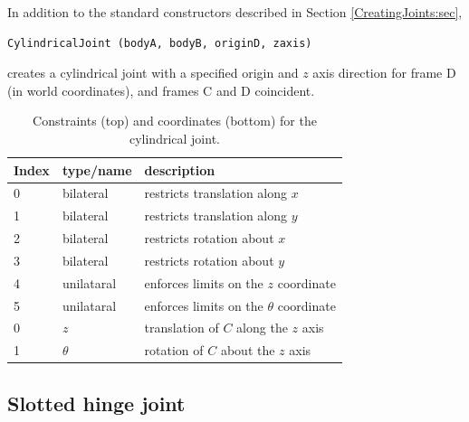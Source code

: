 In addition to the standard constructors described in
Section \ref{CreatingJoints:sec},
\begin{lstlisting}[]
  CylindricalJoint (bodyA, bodyB, originD, zaxis)
\end{lstlisting}
%
creates a cylindrical joint with a specified origin and $z$ axis direction
for frame D (in world coordinates), and frames C and D coincident.

\begin{table}[h]
\centering
\begin{tabular}{|l|l|l|}
\hline
Index & type/name & description \\
\hline
0 & bilateral & restricts translation along $x$ \\
1 & bilateral & restricts translation along $y$ \\
2 & bilateral & restricts rotation about $x$ \\
3 & bilateral & restricts rotation about $y$ \\
4 & unilataral & enforces limits on the $z$ coordinate \\
5 & unilataral & enforces limits on the $\theta$ coordinate \\
\hline
\hline
0 & $z$ & translation of $C$ along the $z$ axis \\
1 & $\theta$ & rotation of $C$ about the $z$ axis \\
\hline
\end{tabular}
\caption{Constraints (top) and coordinates (bottom) for the cylindrical joint.}
\label{CylindricalConstraints:tbl}
\end{table}

\subsection{Slotted hinge joint}
\label{SlottedHingeJoint:sec}

